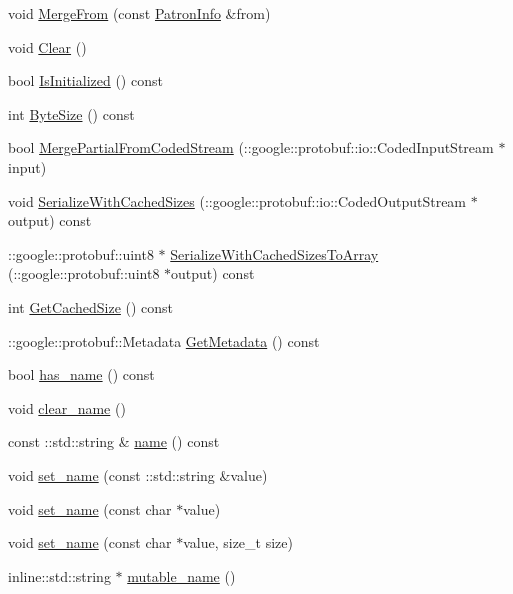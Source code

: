 \begin{DoxyCompactItemize}
\item 
void \hyperlink{classPatronInfo_a77aa295f388bfa94f29bdd98634ad3c5}{Merge\-From} (const \hyperlink{classPatronInfo}{Patron\-Info} \&from)
\item 
void \hyperlink{classPatronInfo_aca92fbacbd37a3653b509316e3b0fdcc}{Clear} ()
\item 
bool \hyperlink{classPatronInfo_a96ea7f542b35b04c51f7472f1835d9b9}{Is\-Initialized} () const 
\item 
int \hyperlink{classPatronInfo_a369d6237c1c1818e21f855f009e4e4a5}{Byte\-Size} () const 
\item 
bool \hyperlink{classPatronInfo_ad2a08cf2a0e510ad38d13ace37940f35}{Merge\-Partial\-From\-Coded\-Stream} (\-::google\-::protobuf\-::io\-::\-Coded\-Input\-Stream $\ast$input)
\item 
void \hyperlink{classPatronInfo_a2014a18d3ecd016f33a5ca2dcf2fbb4b}{Serialize\-With\-Cached\-Sizes} (\-::google\-::protobuf\-::io\-::\-Coded\-Output\-Stream $\ast$output) const 
\item 
\-::google\-::protobuf\-::uint8 $\ast$ \hyperlink{classPatronInfo_a57aba118aa722151f07ea7862e3ed20a}{Serialize\-With\-Cached\-Sizes\-To\-Array} (\-::google\-::protobuf\-::uint8 $\ast$output) const 
\item 
int \hyperlink{classPatronInfo_ada847522a5849eb867c6ab466e5b56ad}{Get\-Cached\-Size} () const 
\item 
\-::google\-::protobuf\-::\-Metadata \hyperlink{classPatronInfo_a05066fa32a7ce5b28932d2a3e5ec2a49}{Get\-Metadata} () const 
\item 
bool \hyperlink{classPatronInfo_ad25241b5045dbb3279aae6681b51028b}{has\-\_\-name} () const 
\item 
void \hyperlink{classPatronInfo_afaf56ce6669760182219446994637df9}{clear\-\_\-name} ()
\item 
const \-::std\-::string \& \hyperlink{classPatronInfo_a29dc831b533f582a76bbd10dd608aa2d}{name} () const 
\item 
void \hyperlink{classPatronInfo_a53c6b8ce4f6a2d6a939dc291994303be}{set\-\_\-name} (const \-::std\-::string \&value)
\item 
void \hyperlink{classPatronInfo_a35aa23931dbe3e7709ed39b6be1bdd6c}{set\-\_\-name} (const char $\ast$value)
\item 
void \hyperlink{classPatronInfo_a25a1bb64ae2265a0cc3b24a1e742c1be}{set\-\_\-name} (const char $\ast$value, size\-\_\-t size)
\item 
inline\-::std\-::string $\ast$ \hyperlink{classPatronInfo_ae36fe5a1add1af55737caab36d54c72c}{mutable\-\_\-name} ()

\end{DoxyCompactItemize}
